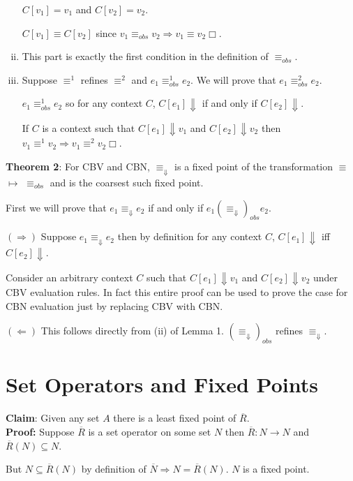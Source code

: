 \documentclass[10pt]{article}
\newcommand{\problem}[1]{\section{\sf #1}}
\begin{document}
\begin{enumerate}[(i)]
$C[v_1] = v_1$ and $C[v_2] = v_2$.

$C[v_1] \equiv C[v_2]$ since   $v_1 \equiv_{obs} v_2 \Rightarrow v_1 \equiv v_2 \Box$.
\item This part is exactly the first condition in the definition of $\equiv_{obs}$.
\item Suppose $\equiv^1$ refines $\equiv^2$ and $e_1 \equiv^1_{obs} e_2$. We will prove that $e_1 \equiv^2_{obs} e_2$.

$e_1 \equiv^1_{obs} e_2$ so for any context $C$, $C[e_1] \Downarrow$ if and only if $C[e_2] \Downarrow$.

If $C$ is a context such that $C[e_1] \Downarrow v_1$ and $C[e_2] \Downarrow v_2$ then $v_1 \equiv^1 v_2 \Rightarrow v_1 \equiv^2 v_2 \Box$.
\end{enumerate}

\textbf{Theorem 2}: For CBV and CBN, $\equiv_{\Downarrow}$ is a fixed point of the transformation $\equiv$  $\mapsto$  $\equiv_{obs}$  and is the coarsest such fixed point.

First we will prove that $e_1 \equiv_{\Downarrow} e_2$ if and only if $e_1  (\equiv_{\Downarrow})_{obs} e_2$.

$(\Rightarrow)$ Suppose  $e_1 \equiv_{\Downarrow} e_2$ then by definition for any context $C$, $C[e_1] \Downarrow$ iff $C[e_2] \Downarrow$.

Consider an arbitrary context $C$ such that $C[e_1] \Downarrow v_1$ and $C[e_2] \Downarrow v_2$ under CBV evaluation rules. In fact this entire proof can be used to prove the case for CBN evaluation just by replacing CBV with CBN.


$(\Leftarrow)$ This follows directly from (ii) of Lemma 1. $(\equiv_{\Downarrow})_{obs}$ refines $\equiv_{\Downarrow}$.


\problem{Set Operators and Fixed Points}

\textbf{Claim}: Given any set $A$ there is a least fixed point of $\overline R$.\\

\textbf{Proof:} Suppose $\overline R$ is a set operator on some set $N$ then $\overline R : N \rightarrow N$ and $\overline R (N) \subseteq N$.

But $N \subseteq \overline R (N)$ by definition of $\overline{N} \Rightarrow N = \overline{R} (N)$. $N$ is a fixed point.
\end{document}
